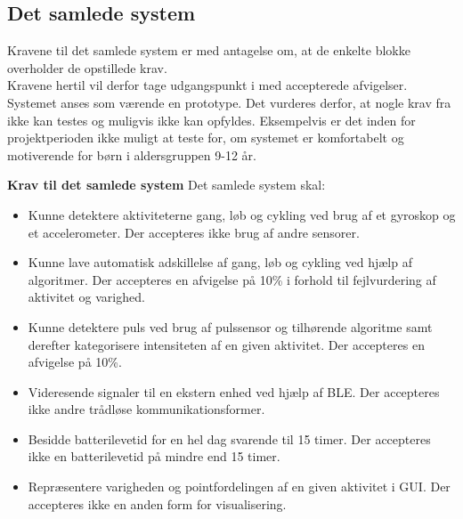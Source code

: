 \subsection{Det samlede system} \label{krav_samlet_sys}
Kravene til det samlede system er med antagelse om, at de enkelte blokke overholder de opstillede krav.\\
Kravene hertil vil derfor tage udgangspunkt i  med accepterede afvigelser. Systemet anses som værende en prototype. Det vurderes derfor, at nogle krav fra  ikke kan testes og muligvis ikke kan opfyldes. Eksempelvis er det inden for projektperioden ikke muligt at teste for, om systemet er komfortabelt og motiverende for børn i aldersgruppen 9-12 år.

\textbf{Krav til det samlede system} \newline
Det samlede system skal:
\begin{itemize}
	\item Kunne detektere aktiviteterne gang, løb og cykling ved brug af et gyroskop og et accelerometer. Der accepteres ikke brug af andre sensorer.
	\item Kunne lave automatisk adskillelse af gang, løb og cykling ved hjælp af algoritmer. Der accepteres en afvigelse på 10\% i forhold til fejlvurdering af aktivitet og varighed.
	\item Kunne detektere puls ved brug af pulssensor og tilhørende algoritme samt derefter kategorisere intensiteten af en given aktivitet. Der accepteres en afvigelse på 10\%.
	\item Videresende signaler til en ekstern enhed ved hjælp af BLE. Der accepteres ikke andre trådløse kommunikationsformer.
	\item Besidde batterilevetid for en hel dag svarende til 15 timer. Der accepteres ikke en batterilevetid på mindre end 15 timer.
	\item Repræsentere varigheden og pointfordelingen af en given aktivitet i GUI. Der accepteres ikke en anden form for visualisering.	
\end{itemize}
